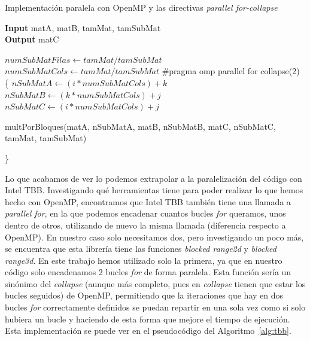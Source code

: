 \documentclass[a4paper,12pt]{article}
\begin{document}
\begin{algorithm}[htbp]
	\caption{Implementación paralela con OpenMP y las directivas {\it parallel for-collapse}}
    \hspace*{\algorithmicindent} \textbf{Input} matA, matB, tamMat, tamSubMat\\
    \hspace*{\algorithmicindent} \textbf{Output} matC
	\begin{algorithmic}[1]
	    \State $numSubMatFilas \leftarrow tamMat/tamSubMat$
		\State $numSubMatCols \leftarrow tamMat/tamSubMat$
		\State \#pragma omp parallel for collapse(2)
		\State \{
				\State $nSubMatA \leftarrow (i * numSubMatCols) + k$ 
				\State $nSubMatB \leftarrow  (k * numSubMatCols) + j$
				\State $nSubMatC \leftarrow  (i * numSubMatCols) + j$
				
				\State multPorBloques(matA, nSubMatA, matB, nSubMatB, matC, nSubMatC, tamMat, tamSubMat)
            \EndFor
        \EndFor
		\EndFor

		\State \}
	\end{algorithmic}
	\label{alg:for-collapse}
\end{algorithm}

Lo que acabamos de ver lo podemos extrapolar a la paralelización del código con Intel TBB. Investigando qué herramientas tiene para poder realizar lo que hemos hecho con OpenMP, encontramos que Intel TBB también tiene una llamada a {\it parallel for}, en la que podemos encadenar cuantos bucles {\it for} queramos, unos dentro de otros, utilizando de nuevo la misma llamada (diferencia respecto a OpenMP). En nuestro caso solo necesitamos dos, pero investigando un poco más, se encuentra que esta librería tiene las funciones {\it blocked range2d} y {\it blocked range3d}. En este trabajo hemos utilizado solo la primera, ya que en nuestro código solo encadenamos 2 bucles {\it for} de forma paralela. Esta función sería un sinónimo del {\it collapse} (aunque más completo, pues en {\it collapse} tienen que estar los bucles seguidos) de OpenMP, permitiendo que la iteraciones que hay en dos bucles {\it for} correctamente definidos se puedan repartir en una sola vez como si solo hubiera un bucle y haciendo de esta forma que mejore el tiempo de ejecución. Esta implementación se puede ver en el pseudocódigo del Algoritmo~\ref{alg:tbb}.
\end{document}
